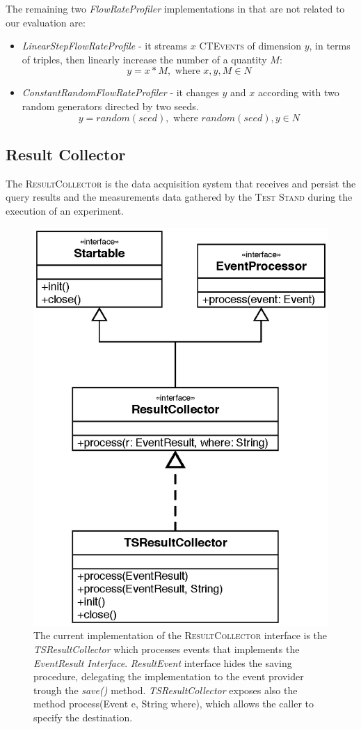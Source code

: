 The remaining two  \textit{FlowRateProfiler} implementations in \name that are not related to our evaluation are:
\begin{itemize}
\item \textit{LinearStepFlowRateProfile} - it streams $x$ \textsc{CTEvents} of dimension $y$, in terms of triples, then linearly increase the number of a quantity $M$: \[y=x*M, \text{ where } x,y,M \in N\]
\item \textit{ConstantRandomFlowRateProfiler} - it changes $y$ and $x$ according with two random generators directed by two seeds. \[y=random(seed), \text{ where } random(seed),y \in N\]
\end{itemize}


\subsection{Result Collector} 

\noindent The \textsc{ResultCollector} is the data acquisition system that receives and persist the query results and the measurements data gathered by the \textsc{Test Stand} during the execution of an experiment.

\begin{figure}[tbh]
  \centering
	\includegraphics[width=0.5\linewidth]{images/uml_resultcollector}
	\caption[UML Schema: \textsc{ResultCollector} Current Implementation]{The current implementation of the \textsc{ResultCollector} interface is the \textit{TSResultCollector} which processes events that implements the \textit{EventResult Interface}. \textit{ResultEvent} interface hides the saving procedure, delegating the implementation to the event provider trough    the \textit{save()} method. \textit{TSResultCollector} exposes also the method process(Event e, String where), which allows the caller to specify the destination. } 
  	\label{fig:uml_resultcollector}
\end{figure}

